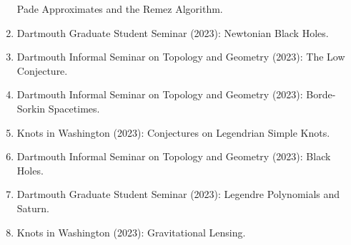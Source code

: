 \documentclass[a4paper,sans]{moderncv}
\begin{document}
\begin{enumerate}
                Pade Approximates and the Remez Algorithm.
            \item
                Dartmouth Graduate Student Seminar (2023):
                Newtonian Black Holes.
            \item
                Dartmouth Informal Seminar on Topology and Geometry (2023):
                The Low Conjecture.
            \item
                Dartmouth Informal Seminar on Topology and Geometry (2023):
                Borde-Sorkin Spacetimes.
            \item
                Knots in Washington (2023):
                Conjectures on Legendrian Simple Knots.
            \item
                Dartmouth Informal Seminar on Topology and Geometry (2023):
                Black Holes.
            \item
                Dartmouth Graduate Student Seminar (2023):
                Legendre Polynomials and Saturn.
            \item
                Knots in Washington (2023):
                Gravitational Lensing.
        \end{enumerate}
\end{document}

